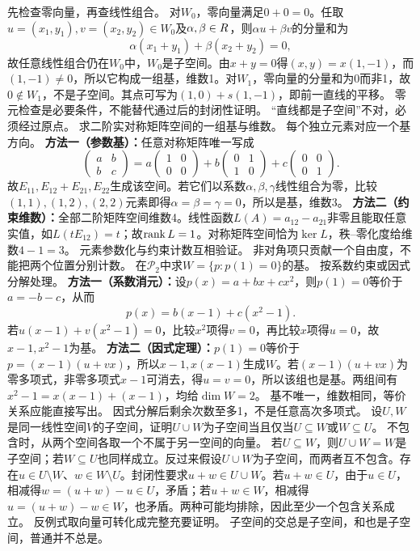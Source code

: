 {先检查零向量，再查线性组合。}
{对$W_0$，零向量满足$0+0=0$。任取$u=(x_1,y_1),v=(x_2,y_2)\in W_0$及$\alpha,\beta\in R$，则$\alpha u+\beta v$的分量和为
\[\alpha(x_1+y_1)+\beta(x_2+y_2)=0,\]
故任意线性组合仍在$W_0$中，$W_0$是子空间。由$x+y=0$得$(x,y)=x(1,-1)$，而$(1,-1)\ne0$，所以它构成一组基，维数1。对$W_1$，零向量的分量和为0而非1，故$0\notin W_1$，不是子空间。其点可写为$(1,0)+s(1,-1)$，即前一直线的平移。}
{零元检查是必要条件，不能替代通过后的封闭性证明。}
{“直线都是子空间”不对，必须经过原点。}
{求二阶实对称矩阵空间的一组基与维数。}
{每个独立元素对应一个基方向。}
{\textbf{方法一（参数基）：}任意对称矩阵唯一写成
\[\begin{pmatrix}a&b\\b&c\end{pmatrix}
=a\begin{pmatrix}1&0\\0&0\end{pmatrix}
+b\begin{pmatrix}0&1\\1&0\end{pmatrix}
+c\begin{pmatrix}0&0\\0&1\end{pmatrix}.\]
故$E_{11},E_{12}+E_{21},E_{22}$生成该空间。若它们以系数$\alpha,\beta,\gamma$线性组合为零，比较$(1,1),(1,2),(2,2)$元素即得$\alpha=\beta=\gamma=0$，所以是基，维数3。
\textbf{方法二（约束维数）：}全部二阶矩阵空间维数4。线性函数$L(A)=a_{12}-a_{21}$非零且能取任意实值，如$L(tE_{12})=t$；故$\operatorname{rank} L=1$。对称矩阵空间恰为$\ker L$，秩--零化度给维数$4-1=3$。}
{元素参数化与约束计数互相验证。}
{非对角项只贡献一个自由度，不能把两个位置分别计数。}
{在$\mathcal P_2$中求$W=\{p:p(1)=0\}$的基。}
{按系数约束或因式分解处理。}
{\textbf{方法一（系数消元）：}设$p(x)=a+bx+cx^2$，则$p(1)=0$等价于$a=-b-c$，从而
\[p(x)=b(x-1)+c(x^2-1).\]
若$u(x-1)+v(x^2-1)=0$，比较$x^2$项得$v=0$，再比较$x$项得$u=0$，故$x-1,x^2-1$为基。
\textbf{方法二（因式定理）：}$p(1)=0$等价于$p=(x-1)(u+vx)$，所以$x-1,x(x-1)$生成$W$。若$(x-1)(u+vx)$为零多项式，非零多项式$x-1$可消去，得$u=v=0$，所以该组也是基。两组间有$x^2-1=x(x-1)+(x-1)$，均给$\dim W=2$。}
{基不唯一，维数相同，等价关系应能直接写出。}
{因式分解后剩余次数至多1，不是任意高次多项式。}
{设$U,W$是同一线性空间$V$的子空间，证明$U\cup W$为子空间当且仅当$U\subseteq W$或$W\subseteq U$。}
{不包含时，从两个空间各取一个不属于另一空间的向量。}
{若$U\subseteq W$，则$U\cup W=W$是子空间；若$W\subseteq U$也同样成立。反过来假设$U\cup W$为子空间，而两者互不包含。存在$u\in U\setminus W$、$w\in W\setminus U$。封闭性要求$u+w\in U\cup W$。若$u+w\in U$，由于$u\in U$，相减得$w=(u+w)-u\in U$，矛盾；若$u+w\in W$，相减得$u=(u+w)-w\in W$，也矛盾。两种可能均排除，因此至少一个包含关系成立。}
{反例式取向量可转化成完整充要证明。}
{子空间的交总是子空间，和也是子空间，普通并不总是。}
